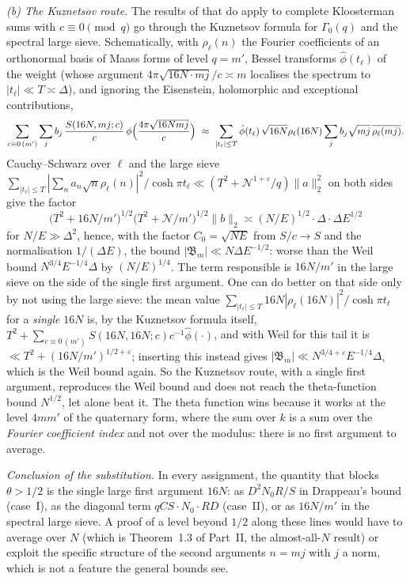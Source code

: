 \documentclass[11pt,a4paper]{article}
\theoremstyle{remark}
\theoremstyle{definition}
\newcommand{\e}{\varepsilon}
\begin{document}
\emph{(b) The Kuznetsov route.} The results of \cite{DI} that do apply to complete Kloosterman sums with $c\equiv0\pmod q$ go through the Kuznetsov formula for $\Gamma_0(q)$ and the spectral large sieve. Schematically, with $\rho_\ell(n)$ the Fourier coefficients of an orthonormal basis of Maass forms of level $q=m'$, Bessel transforms $\hat\phi(t_\ell)$ of the weight (whose argument $4\pi\sqrt{16N\cdot mj}/c\asymp m$ localises the spectrum to $|t_\ell|\ll T\asymp\Delta$), and ignoring the Eisenstein, holomorphic and exceptional contributions,
\[
\sum_{c\equiv0\,(m')}\sum_jb_j\,\frac{S(16N,mj;c)}{c}\,\phi\Bigl(\frac{4\pi\sqrt{16Nmj}}c\Bigr)\ \approx\ \sum_{|t_\ell|\le T}\hat\phi(t_\ell)\,\sqrt{16N}\rho_\ell(16N)\sum_jb_j\sqrt{mj}\,\overline{\rho_\ell(mj)} .
\]
Cauchy--Schwarz over $\ell$ and the large sieve $\sum_{|t_\ell|\le T}|\sum_na_n\sqrt n\rho_\ell(n)|^2/\cosh\pi t_\ell\ll(T^2+\mathcal N^{1+\e}/q)\|a\|_2^2$ on both sides give the factor
\[
\bigl(T^2+16N/m'\bigr)^{1/2}\bigl(T^2+\mathcal N/m'\bigr)^{1/2}\|b\|_2\asymp(N/E)^{1/2}\cdot\Delta\cdot\Delta E^{1/2}
\]
for $N/E\gg\Delta^2$, hence, with the factor $C_0=\sqrt{NE}$ from $S/c\to S$ and the normalisation $1/(\Delta E)$, the bound $|\mathfrak B_m|\ll N\Delta E^{-1/2}$: worse than the Weil bound $N^{3/4}E^{-1/4}\Delta$ by $(N/E)^{1/4}$. The term responsible is $16N/m'$ in the large sieve on the side of the single first argument. One can do better on that side only by not using the large sieve: the mean value $\sum_{|t_\ell|\le T}16N|\rho_\ell(16N)|^2/\cosh\pi t_\ell$ for a \emph{single} $16N$ is, by the Kuznetsov formula itself, $T^2+\sum_{c\equiv0\,(m')}S(16N,16N;c)c^{-1}\hat\phi(\cdot)$, and with Weil for this tail it is $\ll T^2+(16N/m')^{1/2+\e}$; inserting this instead gives $|\mathfrak B_m|\ll N^{3/4+\e}E^{-1/4}\Delta$, which is the Weil bound again. So the Kuznetsov route, with a single first argument, reproduces the Weil bound and does not reach the theta-function bound $N^{1/2}$, let alone beat it. The theta function wins because it works at the level $4mm'$ of the quaternary form, where the sum over $k$ is a sum over the \emph{Fourier coefficient index} and not over the modulus: there is no first argument to average.

\emph{Conclusion of the substitution.} In every assignment, the quantity that blocks $\theta>1/2$ is the single large first argument $16N$: as $D^2N_0R/S$ in Drappeau's bound (case~I), as the diagonal term $qCS\cdot N_0\cdot RD$ (case~II), or as $16N/m'$ in the spectral large sieve. A proof of a level beyond $1/2$ along these lines would have to average over $N$ (which is Theorem~1.3 of Part~II, the almost-all-$N$ result) or exploit the specific structure of the second arguments $n=mj$ with $j$ a norm, which is not a feature the general bounds see.
\end{document}
